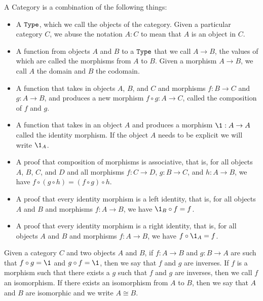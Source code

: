 \documentclass[../../math.tex]{subfiles}
\begin{document}
\begin{definition}
    A Category is a combination of the following things:
    \begin{itemize}
        \item A $\Type$, which we call the objects of the category.  Given a
            particular category $C$, we abuse the notation $A : C$ to mean that
            $A$ is an object in $C$.
        \item A function from objects $A$ and $B$ to a $\Type$ that we call $A
            \to B$, the values of which are called the morphisms from $A$ to
            $B$.  Given a morphism $A \to B$, we call $A$ the domain and $B$ the
            codomain.
        \item A function that takes in objects $A$, $B$, and
            $C$ and morphisms $f : B \to C$ and $g : A \to B$, and produces a
            new morphism $f \circ g : A \to C$, called the composition of $f$
            and $g$.
        \item A function that takes in an object $A$ and produces a morphism
            $\1 : A \to A$ called the identity morphism.  If the object
            $A$ needs to be explicit we will write $\1_A$.
        \item A proof that composition of morphisms is associative, that is, for
            all objects $A$, $B$, $C$, and $D$ and all morphisms $f : C \to D$,
            $g : B \to C$, and $h : A \to B$, we have $f \circ (g \circ h) = (f
            \circ g) \circ h$.
        \item A proof that every identity morphism is a left identity, that is,
            for all objects $A$ and $B$ and morphisms $f : A \to B$, we have
            $\1_B \circ f = f$.
        \item A proof that every identity morphism is a right identity, that is,
            for all objects $A$ and $B$ and morphisms $f : A \to B$, we have
            $f \circ \1_A= f$.
    \end{itemize}
\end{definition}

\begin{definition}
    Given a category $C$ and two objects $A$ and $B$, if $f : A \to B$ and $g :
    B \to A$ are such that $f \circ g = \1$ and $g \circ f = \1$, then we
    say that $f$ and $g$ are inverses.  If $f$ is a morphism such that there
    exists a $g$ such that $f$ and $g$ are inverses, then we call $f$ an
    isomorphism.  If there exists an isomorphism from $A$ to $B$, then we say
    that $A$ and $B$ are isomorphic and we write $A \cong B$.
\end{definition}
\end{document}
